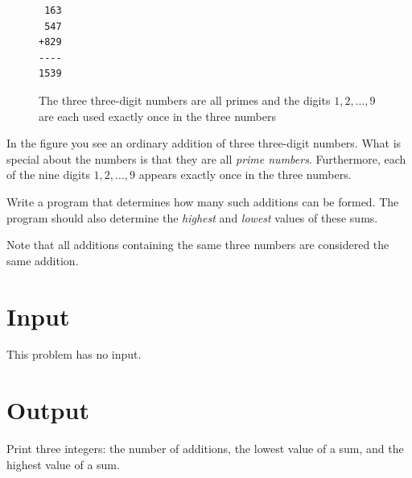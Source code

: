 
\begin{figure}
\centering
\begin{verbatim}
 163
 547
+829
----
1539
\end{verbatim}
\caption{The three three-digit numbers are all primes and the digits $1, 2, \ldots, 9$ are each used exactly once in the three numbers}
\end{figure}

In the figure you see an ordinary addition of three three-digit numbers. What is special about the numbers is that they are all \emph{prime numbers}. Furthermore, each of the nine digits $1, 2, \ldots, 9$ appears exactly once in the three numbers.

Write a program that determines how many such additions can be formed. The program should also determine the \emph{highest} and \emph{lowest} values of these sums.

Note that all additions containing the same three numbers are considered the same addition.

\section*{Input}
This problem has no input.

\section*{Output}
Print three integers: the number of additions, the lowest value of a sum, and the highest value of a sum.
